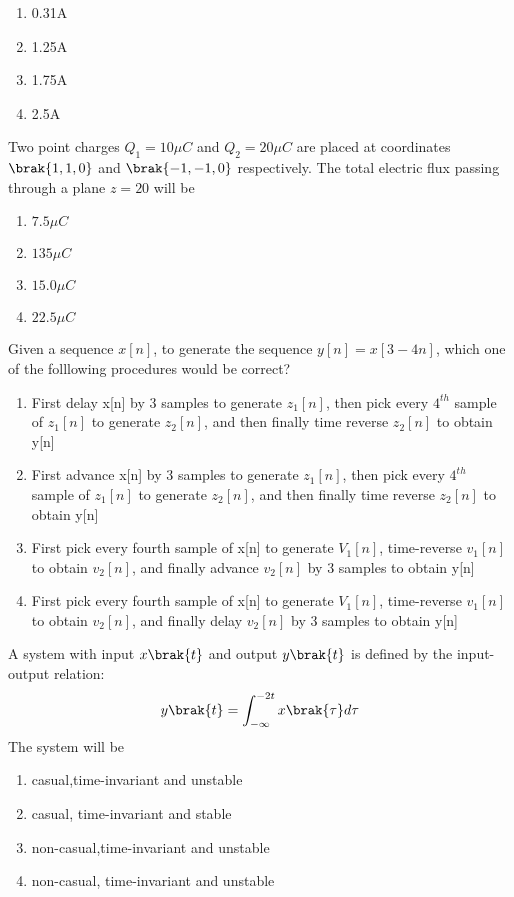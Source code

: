 \begin{enumerate}
          \item 0.31A
          \item 1.25A
          \item 1.75A
          \item 2.5A
      \end{enumerate}
      \item Two point charges $Q_1=10\mu C$ and $Q_2=20 \mu C$ are placed at coordinates $\brak{1,1,0}$ and $\brak{-1,-1,0}$ respectively. The total electric flux passing through a plane $z=20$ will be
      \begin{enumerate}
          \item $7.5\mu C$
          \item $135 \mu C$
          \item $15.0 \mu C$
          \item $22.5 \mu C$
      \end{enumerate}
      \item Given a sequence $x[n]$, to generate the sequence $y[n]=x[3-4n]$, which one of the folllowing procedures would be correct?
      \begin{enumerate}
          \item First delay x[n] by 3 samples to generate $z_1[n]$, then pick every $4^{th}$ sample of $z_1[n]$ to generate $z_2[n]$, and then finally time reverse $z_2[n]$ to obtain y[n]
          \item First advance x[n] by 3 samples to generate $z_1[n]$, then pick every $4^{th}$ sample of $z_1[n]$ to generate $z_2[n]$, and then finally time reverse $z_2[n]$ to obtain y[n]
          \item First pick every fourth sample of x[n] to generate $V_1[n]$, time-reverse $v_1[n]$ to obtain $v_2[n]$, and finally advance $v_2[n]$ by 3 samples to obtain y[n]
          \item  First pick every fourth sample of x[n] to generate $V_1[n]$, time-reverse $v_1[n]$ to obtain $v_2[n]$, and finally delay $v_2[n]$ by 3 samples to obtain y[n]
      \end{enumerate}
      \item A system with input $x\brak{t}$ and output $y\brak{t}$ is defined by the input-output relation:
      \begin{align}
          y\brak{t}=\int_{-\infty}^{-2t}x\brak{\tau}d\tau
      \end{align}
      The system will be 
      \begin{enumerate}
          \item casual,time-invariant and unstable
          \item casual, time-invariant and stable
          \item non-casual,time-invariant and unstable
          \item non-casual, time-invariant and unstable
      \end{enumerate}
